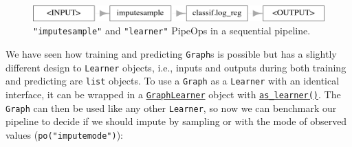 \begin{Shaded}
\begin{Highlighting}[]
\OtherTok{=} \NormalTok{(}\NormalTok{)}
\OtherTok{=} \NormalTok{(}\NormalTok{) }\SpecialCharTok{\%\textgreater{}\textgreater{}\%}
\SpecialCharTok{$}\NormalTok{(} \NormalTok{)}
\end{Highlighting}
\end{Shaded}

\begin{figure}

{\centering \includegraphics[width=1\textwidth,height=\textheight]{chapters/chapter7/sequential_pipelines_files/figure-pdf/fig-pipelines-learnerpipeop-1.png}

}

\caption{\label{fig-pipelines-learnerpipeop}\texttt{"imputesample"} and
\texttt{"learner"} PipeOps in a sequential pipeline.}

\end{figure}

We have seen how training and predicting \texttt{Graph}s is possible but
has a slightly different design to \texttt{Learner} objects, i.e.,
inputs and outputs during both training and predicting are \texttt{list}
objects. To use a \texttt{Graph} as a \texttt{Learner} with an identical
interface, it can be wrapped in a
\href{https://mlr3pipelines.mlr-org.com/reference/mlr_learners_graph.html}{\texttt{GraphLearner}}
object with
\href{https://mlr3.mlr-org.com/reference/as_learner.html}{\texttt{as\_learner()}}.
The \texttt{Graph} can then be used like any other \texttt{Learner}, so
now we can benchmark our pipeline to decide if we should impute by
sampling or with the mode of observed values
(\texttt{po("imputemode")}):


